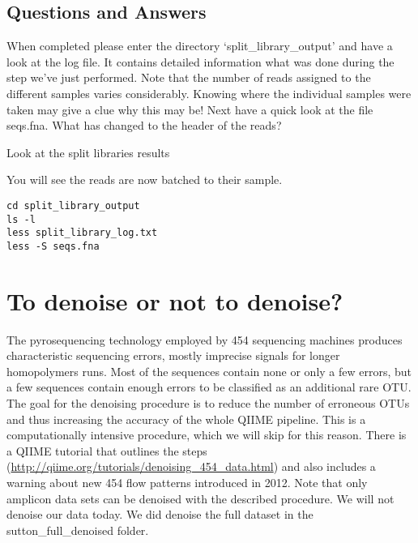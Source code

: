 \subsection{Questions and Answers}

\begin{questions}
When completed please enter the directory ‘split_library_output’ and have a look at the log file. It contains detailed information what was done during the step we’ve just performed. Note that the number of reads assigned to the different samples varies considerably. Knowing where the individual samples were taken may give a clue why this may be! Next have a quick look at the file seqs.fna. What has changed to the header of the reads?

\begin{answer}
Look at the split libraries results
\end{answer}

\end{questions}

\begin{steps}

You will see the reads are now batched to their sample.
\begin{lstlisting}
cd split_library_output
ls -l
less split_library_log.txt
less -S seqs.fna

\end{lstlisting}

\end{steps}

\section{To denoise or not to denoise?}

The pyrosequencing technology employed by 454 sequencing machines produces characteristic sequencing errors, mostly imprecise signals for longer homopolymers runs. Most of the sequences contain none or only a few errors, but a few sequences contain enough errors to be classified as an additional rare OTU. The goal for the denoising procedure is to reduce the number of erroneous OTUs and thus increasing the accuracy of the whole QIIME pipeline. This is a computationally intensive procedure, which we will skip for this reason. There is a QIIME tutorial that outlines the steps (\url{http://qiime.org/tutorials/denoising_454_data.html}) and also includes a warning about new 454 flow patterns introduced in 2012. Note that only amplicon data sets can be denoised with the described procedure. We will not denoise our data today. We did denoise the full dataset in the sutton_full_denoised folder.


